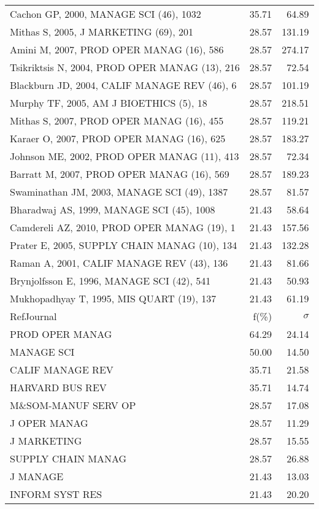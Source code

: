 \documentclass[a4paper,11pt]{report}
\begin{document}
\begin{landscape}
\begin{table}[!ht]
{\begin{tabular}{|l r r|}
Cachon GP, 2000, MANAGE SCI (46), 1032 & 35.71 & 64.89\\
Mithas S, 2005, J MARKETING (69), 201 & 28.57 & 131.19\\
Amini M, 2007, PROD OPER MANAG (16), 586 & 28.57 & 274.17\\
Tsikriktsis N, 2004, PROD OPER MANAG (13), 216 & 28.57 & 72.54\\
Blackburn JD, 2004, CALIF MANAGE REV (46), 6 & 28.57 & 101.19\\
Murphy TF, 2005, AM J BIOETHICS (5), 18 & 28.57 & 218.51\\
Mithas S, 2007, PROD OPER MANAG (16), 455 & 28.57 & 119.21\\
Karaer O, 2007, PROD OPER MANAG (16), 625 & 28.57 & 183.27\\
Johnson ME, 2002, PROD OPER MANAG (11), 413 & 28.57 & 72.34\\
Barratt M, 2007, PROD OPER MANAG (16), 569 & 28.57 & 189.23\\
Swaminathan JM, 2003, MANAGE SCI (49), 1387 & 28.57 & 81.57\\
Bharadwaj AS, 1999, MANAGE SCI (45), 1008 & 21.43 & 58.64\\
Camdereli AZ, 2010, PROD OPER MANAG (19), 1 & 21.43 & 157.56\\
Prater E, 2005, SUPPLY CHAIN MANAG (10), 134 & 21.43 & 132.28\\
Raman A, 2001, CALIF MANAGE REV (43), 136 & 21.43 & 81.66\\
Brynjolfsson E, 1996, MANAGE SCI (42), 541 & 21.43 & 50.93\\
Mukhopadhyay T, 1995, MIS QUART (19), 137 & 21.43 & 61.19\\
\hline
\hline
RefJournal & f(\%) & $\sigma$\\
\hline
PROD OPER MANAG & 64.29 & 24.14\\
MANAGE SCI & 50.00 & 14.50\\
CALIF MANAGE REV & 35.71 & 21.58\\
HARVARD BUS REV & 35.71 & 14.74\\
M\&SOM-MANUF SERV OP & 28.57 & 17.08\\
J OPER MANAG & 28.57 & 11.29\\
J MARKETING & 28.57 & 15.55\\
SUPPLY CHAIN MANAG & 28.57 & 26.88\\
J MANAGE & 21.43 & 13.03\\
INFORM SYST RES & 21.43 & 20.20\\
\hline
\end{tabular}
}
\end{table}

\end{landscape}
\end{document}
